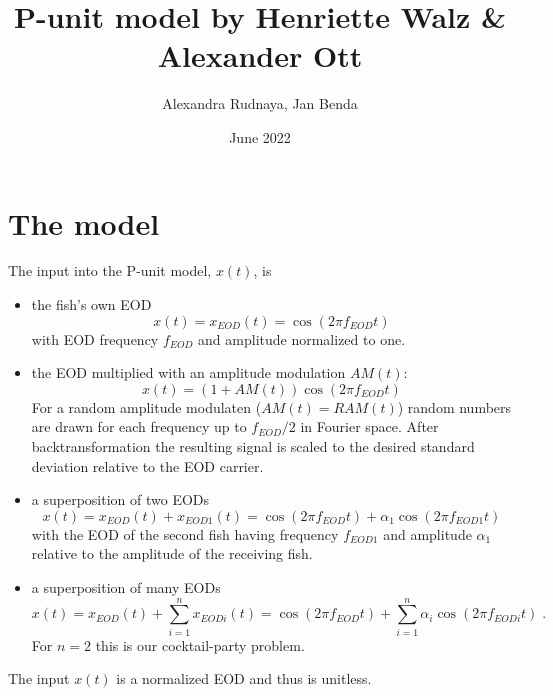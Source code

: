 \documentclass[12pt,a4paper]{article}
\title{P-unit model by Henriette Walz \& Alexander Ott}
\author{Alexandra Rudnaya, Jan Benda}
\date{June 2022}
\begin{document}
\maketitle


\section{The model}

The input into the P-unit model, $x(t)$, is
\begin{itemize}
\item the fish's own EOD
  \begin{equation}
    \label{eod}
    x(t) = x_{EOD}(t) = \cos(2\pi f_{EOD} t)
  \end{equation}
  with EOD frequency $f_{EOD}$ and amplitude normalized to one.
\item the EOD multiplied with an amplitude modulation $AM(t)$:
  \begin{equation}
    \label{am}
    x(t) = (1+AM(t)) \cos(2\pi f_{EOD} t)
  \end{equation}
  For a random amplitude modulaten ($AM(t) = RAM(t)$) random numbers
  are drawn for each frequency up to $f_{EOD}/2$ in Fourier
  space. After backtransformation the resulting signal is scaled to
  the desired standard deviation relative to the EOD carrier.
\item a superposition of two EODs
  \begin{equation}
    \label{beat}
    x(t) = x_{EOD}(t) + x_{EOD1}(t) = \cos(2\pi f_{EOD} t) + \alpha_1 \cos(2\pi f_{EOD1} t)
  \end{equation}
  with the EOD of the second fish having frequency $f_{EOD1}$ and amplitude $\alpha_1$ relative to the amplitude of the receiving fish.
\item a superposition of many EODs
  \begin{equation}
    \label{multibeat}
    x(t) = x_{EOD}(t) + \sum_{i=1}^{n} x_{EODi}(t) = \cos(2\pi f_{EOD} t) + \sum_{i=1}^{n} \alpha_i \cos(2\pi f_{EODi} t) \; .
  \end{equation}
  For $n=2$ this is our cocktail-party problem.  
\end{itemize}
The input $x(t)$ is a normalized EOD and thus is unitless.
\end{document}
